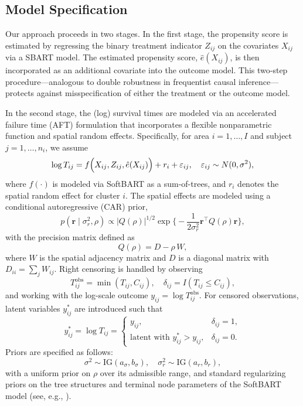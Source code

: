\documentclass[useAMS,referee]{biom}
\begin{document}
\subsection{Model Specification}
Our approach proceeds in two stages. In the first stage, the propensity score is estimated by regressing the binary treatment indicator \( Z_{ij} \) on the covariates \( X_{ij} \) via a SBART model. The estimated propensity score, \(\hat{e}(X_{ij})\), is then incorporated as an additional covariate into the outcome model. This two‐step procedure—analogous to double robustness in frequentist causal inference—protects against misspecification of either the treatment or the outcome model.

In the second stage, the (log) survival times are modeled via an accelerated failure time (AFT) formulation that incorporates a flexible nonparametric function and spatial random effects. Specifically, for area \( i=1,\ldots,I \) and subject \( j=1,\ldots,n_i \), we assume
\[
\log T_{ij} = f\Bigl(X_{ij}, Z_{ij}, \hat{e}(X_{ij})\Bigr) + r_i + \varepsilon_{ij}, \quad \varepsilon_{ij}\sim N(0,\sigma^2),
\]
where \( f(\cdot) \) is modeled via SoftBART as a sum-of-trees, and \( r_i \) denotes the spatial random effect for cluster \( i \). The spatial effects are modeled using a conditional autoregressive (CAR) prior,
\[
p(\bm{r}\mid\sigma_r^2,\rho) \propto \vert Q(\rho)\vert^{1/2} \exp\Biggl\{-\frac{1}{2\sigma_r^2}\bm{r}^\top Q(\rho)\bm{r}\Biggr\},
\]
with the precision matrix defined as
\[
Q(\rho)=D-\rho\,W,
\]
where \( W \) is the spatial adjacency matrix and \( D \) is a diagonal matrix with \( D_{ii}=\sum_jW_{ij} \). Right censoring is handled by observing 
\[
T_{ij}^{\mathrm{obs}} = \min(T_{ij}, C_{ij}), \quad \delta_{ij} = I(T_{ij} \leq C_{ij}),
\]
and working with the log-scale outcome \( y_{ij}=\log T_{ij}^{\mathrm{obs}} \). For censored observations, latent variables \( y_{ij}^\ast \) are introduced such that
\[
y_{ij}^\ast = \log T_{ij} =
\begin{cases}
y_{ij}, & \delta_{ij}=1,\\[1mm]
\text{latent with } y_{ij}^\ast > y_{ij}, & \delta_{ij}=0.
\end{cases}
\]
Priors are specified as follows:
\[
\sigma^2 \sim \mathrm{IG}(a_\sigma,b_\sigma),\quad \sigma_r^2 \sim \mathrm{IG}(a_r,b_r),
\]
with a uniform prior on \(\rho\) over its admissible range, and standard regularizing priors on the tree structures and terminal node parameters of the SoftBART model (see, e.g., \cite{chipman2010bart}).
\end{document}
